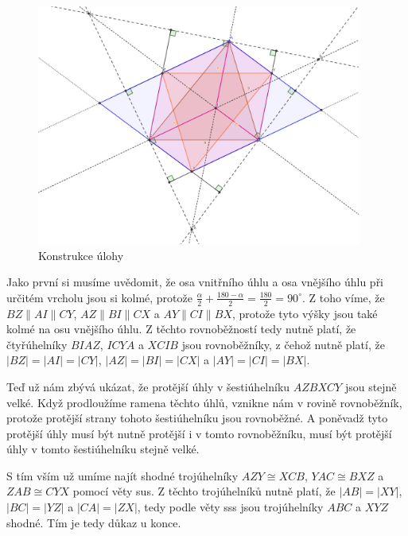 \documentclass{fkssolpub}
\author{Ondřej Sedláček}
\begin{document}
\begin{figure}
	\begin{center}
		\includegraphics[width=0.95\textwidth]{6-fig.png}
	\end{center}
	\caption{Konstrukce úlohy}
	\label{fig:1}
\end{figure}

Jako první si musíme uvědomit, že osa vnitřního úhlu a osa vnějšího úhlu při určitém vrcholu jsou si kolmé, protože $\frac{\alpha}{2} + \frac{180 - \alpha}{2} = \frac{180}{2} = 90^{\circ}$. Z toho víme, že $BZ \parallel AI \parallel CY$, $AZ \parallel BI \parallel CX$ a $AY \parallel CI \parallel BX$, protože tyto výšky jsou také kolmé na osu vnějšího úhlu. Z těchto rovnoběžností tedy nutně platí, že čtyřúhelníky $BIAZ$, $ICYA$ a $XCIB$ jsou rovnoběžníky, z čehož nutně platí, že $|BZ| = |AI| = |CY|$, $|AZ| = |BI| = |CX|$ a $|AY| = |CI| = |BX|$.

Teď už nám zbývá ukázat, že protější úhly v šestiúhelníku $AZBXCY$ jsou stejně velké. Když prodloužíme ramena těchto úhlů, vznikne nám v rovině rovnoběžník, protože protější strany tohoto šestiúhelníku jsou rovnoběžné. A poněvadž tyto protější úhly musí být nutně protější i v tomto rovnoběžníku, musí být protější úhly v tomto šestiúhelníku stejně velké.

S tím vším už umíme najít shodné trojúhelníky $AZY \cong XCB$, $YAC \cong BXZ$ a $ZAB \cong CYX$ pomocí věty sus. Z těchto trojúhelníků nutně platí, že $|AB| = |XY|$, $|BC| = |YZ|$ a $|CA| = |ZX|$, tedy podle věty sss jsou trojúhelníky $ABC$ a $XYZ$ shodné. Tím je tedy důkaz u konce.
\end{document}
